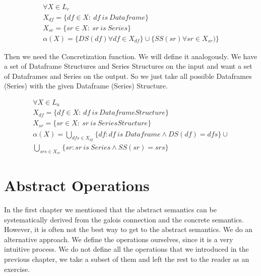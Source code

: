 \begin{defn}
    \begin{gather*}
        \forall X \in L_c \\
        X_{df} = \{df \in X: \: df \: is \: Dataframe\} \\
        X_{sr} = \{sr \in X: \: sr \: is \: Series\} \\
        \alpha(X) = \{DS(df) \forall df \in X_{df}\} \cup \{SS(sr) \forall sr \in X_{sr})\}
    \end{gather*}
\end{defn}

Then we need the Concretization function.
We will define it analogously.
We have a set of Dataframe Structures and Series Structures on the input and want a set of Dataframes and Series
on the output.
So we just take all possible Dataframes (Series) with the given Dataframe (Series) Structure.

\begin{defn}
    \begin{gather*}
        \forall X \in L_a \\
        X_{df} = \{df \in X: \: df \: is \: Dataframe Structure\} \\
        X_{sr} = \{sr \in X: \: sr \: is \: Series Structure\} \\
        \alpha(X) =
        \bigcup_{dfs \in X_{df}}  \{df: df \: is \: Dataframe \land DS(df) = dfs\}
        \cup \\
        \bigcup_{srs \in X_{sr}} \{sr: sr \: is \: Series \land SS(sr) = srs\}
    \end{gather*}
\end{defn}


\section{Abstract Operations}

In the first chapter we mentioned that the abstract semantics can be systematically derived from the galois connection
and the concrete semantics.
However, it is often not the best way to get to the abstract semantics.
We do an alternative approach.
We define the operations ourselves, since it is a very intuitive process. %
We do not define all the operations that we introduced in the previous chapter, we take a subset of them and left the
rest to the reader as an exercise.

